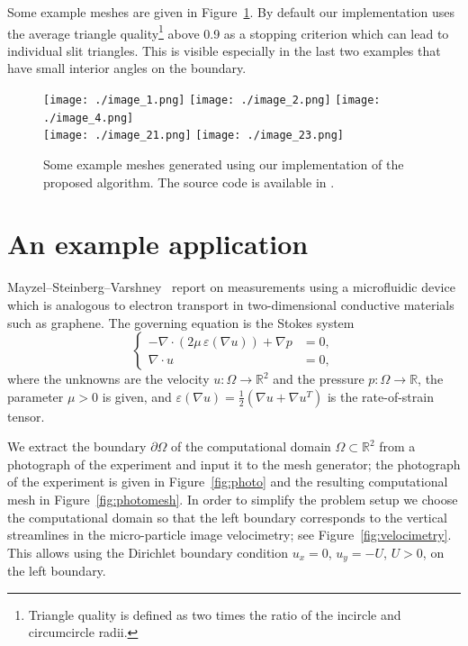 \documentclass[11pt]{article}
\begin{document}
Some example meshes are given in Figure~\ref{fig:moreexamples}.  By
default our implementation uses the average triangle quality\footnote{Triangle
quality is defined as two times the ratio of the incircle and circumcircle
radii.} above 0.9 as a stopping criterion which can lead to individual slit triangles.
This is visible especially in the last two examples that have small
interior angles on the boundary.

\begin{figure}[htbp]
  \centering
  \texttt{[image: ./image\_1.png]}
  \texttt{[image: ./image\_2.png]}
  \texttt{[image: ./image\_4.png]}\\
  \texttt{[image: ./image\_21.png]}
  \texttt{[image: ./image\_23.png]}
  \caption{Some example meshes generated using our
    implementation of the proposed algorithm.
  The source code is available in \cite{tomgustafsson_2020}.}
\label{fig:moreexamples}
\end{figure}

\section{An example application}

Mayzel--Steinberg--Varshney~\cite{mayzel2019stokes} report on measurements using a
microfluidic device which is analogous to electron transport in two-dimensional
conductive materials such as graphene. The governing equation is the Stokes
system
\begin{equation}
  \left\{
  \begin{aligned}
    -\nabla \cdot (2\mu\,\varepsilon(\nabla u)) + \nabla p &= 0, \\
    \nabla \cdot u &= 0,
  \end{aligned}
  \right.
\end{equation}
where the unknowns are the velocity $u : \Omega \rightarrow \mathbb{R}^2$ and
the pressure $p : \Omega \rightarrow \mathbb{R}$, the parameter $\mu > 0$ is
given, and $\varepsilon(\nabla u) = \tfrac12(\nabla u + \nabla u^T)$ is the
rate-of-strain tensor.

We extract the boundary $\partial \Omega$ of the computational domain $\Omega
\subset \mathbb{R}^2$ from a photograph of the experiment and input it to the
mesh generator; the photograph of the experiment is given in
Figure~\ref{fig:photo} and the resulting computational mesh in
Figure~\ref{fig:photomesh}.  In order to simplify the problem setup we choose
the computational domain so that the left boundary corresponds to the vertical
streamlines in the micro-particle image velocimetry; see
Figure~\ref{fig:velocimetry}.  This allows using the Dirichlet boundary
condition $u_x = 0$, $u_y = -U$, $U > 0$, on the left boundary.
\end{document}
